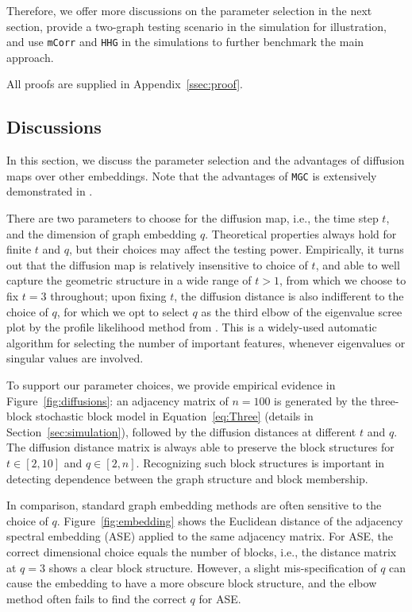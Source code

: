 \documentclass[11pt]{article}
\theoremstyle{definition}
\begin{document}
Therefore, we offer more discussions on the parameter selection in the next section, provide a two-graph testing scenario in the simulation for illustration, and use \texttt{mCorr} and \texttt{HHG} in the simulations to further benchmark the main approach.

All proofs are supplied in Appendix~\ref{ssec:proof}.

\subsection{Discussions}
\label{ss:dis}
 
In this section, we discuss the parameter selection and the advantages of diffusion maps over other embeddings. Note that the advantages of \texttt{MGC} is extensively demonstrated in \cite{shen2016discovering}.

There are two parameters to choose for the diffusion map, i.e., the time step $t$, and the dimension of graph embedding $q$. Theoretical properties always hold for finite $t$ and $q$, but their choices may affect the testing power. Empirically, it turns out that the diffusion map is relatively insensitive to choice of $t$, and able to well capture the geometric structure in a wide range of $t>1$, from which we choose to fix $t=3$ throughout; upon fixing $t$, the diffusion distance is also indifferent to the choice of $q$, for which we opt to select $q$ as the third elbow of the eigenvalue scree plot by the profile likelihood method from \cite{ZhuGhodsi2006}. This is a widely-used automatic algorithm for selecting the number of important features, whenever eigenvalues or singular values are involved. 

To support our parameter choices, we provide empirical evidence in Figure~\ref{fig:diffusions}: an adjacency matrix of $n=100$ is generated by the three-block stochastic block model in Equation~\ref{eq:Three} (details in Section~\ref{sec:simulation}), followed by the diffusion distances at different $t$ and $q$. The diffusion distance matrix is always able to preserve the block structures for $t \in [2,10]$ and $q \in [2,n]$. Recognizing such block structures is important in detecting dependence between the graph structure and block membership.

In comparison, standard graph embedding methods are often sensitive to the choice of $q$. Figure~\ref{fig:embedding} shows the Euclidean distance of the adjacency spectral embedding (ASE) \cite{SussmanEtAl2012} applied to the same adjacency matrix. For ASE, the correct dimensional choice equals the number of blocks, i.e., the distance matrix at $q=3$ shows a clear block structure. However, a slight mis-specification of $q$ can cause the embedding to have a more obscure block structure, and the elbow method often fails to find the correct $q$ for ASE.
\end{document}
